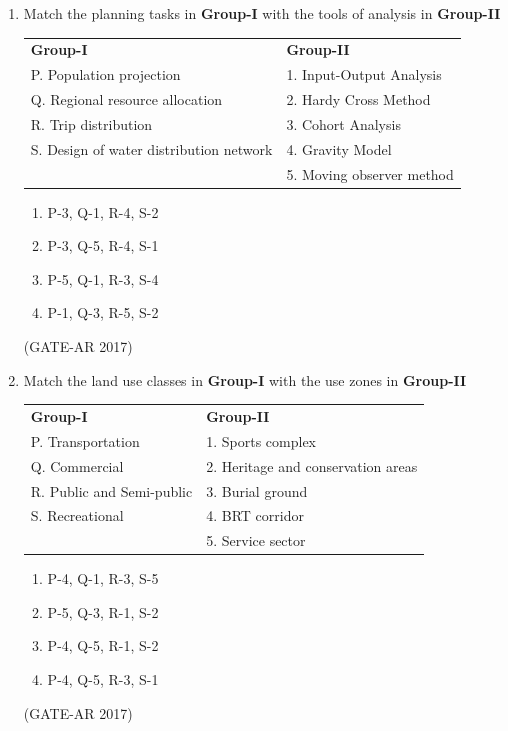 \documentclass[a4paper,10pt]{article}
\begin{document}
\begin{enumerate}
    \item Match the planning tasks in \textbf{Group-I} with the tools of analysis in \textbf{Group-II} \\
    \begin{tabular}{ l l }
	\textbf{Group-I} & \textbf{Group-II} \\
	P. Population projection & 1. Input-Output Analysis \\
	Q. Regional resource allocation & 2. Hardy Cross Method \\
	R. Trip distribution & 3. Cohort Analysis \\
	S. Design of water distribution network & 4. Gravity Model \\
	& 5. Moving observer method \\
	\end{tabular}
	\begin{multicols}{2}
	\begin{enumerate}
        \item P-3, Q-1, R-4, S-2
        \item P-3, Q-5, R-4, S-1
        \item P-5, Q-1, R-3, S-4
        \item P-1, Q-3, R-5, S-2
    \end{enumerate}
	\end{multicols}
    \hfill (GATE-AR 2017)

    \item Match the land use classes in \textbf{Group-I} with the use zones in \textbf{Group-II} \\
    \begin{tabular}{ l l }
	\textbf{Group-I} & \textbf{Group-II} \\
	P. Transportation & 1. Sports complex \\
	Q. Commercial & 2. Heritage and conservation areas \\
	R. Public and Semi-public & 3. Burial ground \\
	S. Recreational & 4. BRT corridor \\
	& 5. Service sector \\
	\end{tabular}
	\begin{multicols}{2}
	\begin{enumerate}
        \item P-4, Q-1, R-3, S-5
        \item P-5, Q-3, R-1, S-2
        \item P-4, Q-5, R-1, S-2
        \item P-4, Q-5, R-3, S-1
    \end{enumerate}
	\end{multicols}
    \hfill (GATE-AR 2017)


\end{enumerate}
\end{document}
